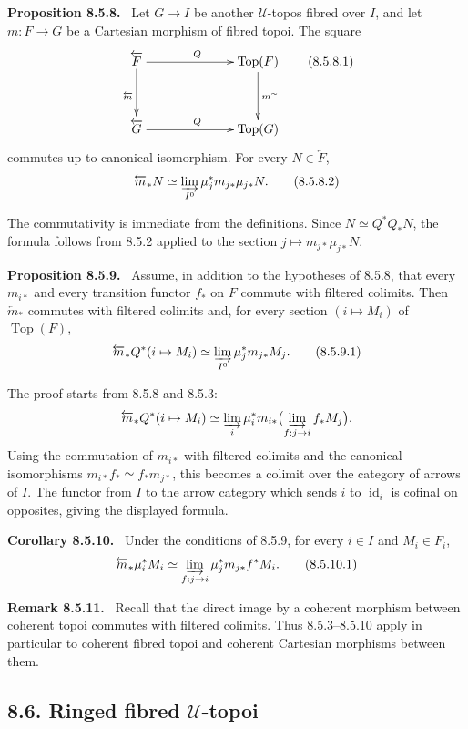 \documentclass[11pt]{article}
\newcommand{\U}{\mathcal{U}}
\newcommand{\Top}{\operatorname{Top}}
\newcommand{\id}{\operatorname{id}}
\newenvironment{statement}[1]{\par\medskip\noindent\textbf{#1.}\ }{\par\medskip}
\newenvironment{remarktext}[1]{\par\medskip\noindent\textbf{#1.}\ }{\par\medskip}
\begin{document}
\begin{statement}{Proposition 8.5.8}
Let \(G\to I\) be another \(\U\)-topos fibred over \(I\), and let \(m:F\to G\) be a Cartesian morphism of fibred topoi. The square
\[
\xymatrix@C=2.4cm@R=1.2cm{
\overleftarrow F\ar[r]^Q\ar[d]_{\overleftarrow m}&\Top(F)\ar[d]^{m^{\sim}}\\
\overleftarrow G\ar[r]^Q&\Top(G)
}
\tag{8.5.8.1}
\]
commutes up to canonical isomorphism. For every \(N\in\overleftarrow F\),
\[
 \overleftarrow m_*N\simeq
 \varinjlim_{I^0}\mu_j^*m_{j*}\mu_{j*}N. \tag{8.5.8.2}
\]
\end{statement}
The commutativity is immediate from the definitions. Since \(N\simeq Q^*Q_*N\), the formula follows from 8.5.2 applied to the section \(j\mapsto m_{j*}\mu_{j*}N\).

\begin{statement}{Proposition 8.5.9}
Assume, in addition to the hypotheses of 8.5.8, that every \(m_{i*}\) and every transition functor \(f_*\) on \(F\) commute with filtered colimits. Then \(\overleftarrow m_*\) commutes with filtered colimits and, for every section \((i\mapsto M_i)\) of \(\Top(F)\),
\[
 \overleftarrow m_*Q^*(i\mapsto M_i)
 \simeq
 \varinjlim_{I^0}\mu_j^*m_{j*}M_j. \tag{8.5.9.1}
\]
\end{statement}
The proof starts from 8.5.8 and 8.5.3:
\[
 \overleftarrow m_*Q^*(i\mapsto M_i)
 \simeq
 \varinjlim_i\mu_i^*m_{i*}\bigl(\varinjlim_{f:j\to i}f_*M_j\bigr).
\]
Using the commutation of \(m_{i*}\) with filtered colimits and the canonical isomorphisms \(m_{i*}f_*\simeq f_*m_{j*}\), this becomes a colimit over the category of arrows of \(I\). The functor from \(I\) to the arrow category which sends \(i\) to \(\id_i\) is cofinal on opposites, giving the displayed formula.

\begin{statement}{Corollary 8.5.10}
Under the conditions of 8.5.9, for every \(i\in I\) and \(M_i\in F_i\),
\[
 \overleftarrow m_*\mu_i^*M_i\simeq
 \varinjlim_{f:j\to i}\mu_j^*m_{j*}f^*M_i. \tag{8.5.10.1}
\]
\end{statement}

\begin{remarktext}{Remark 8.5.11}
Recall that the direct image by a coherent morphism between coherent topoi commutes with filtered colimits. Thus 8.5.3--8.5.10 apply in particular to coherent fibred topoi and coherent Cartesian morphisms between them.
\end{remarktext}

\subsection*{8.6. Ringed fibred \(\U\)-topoi}
\end{document}
